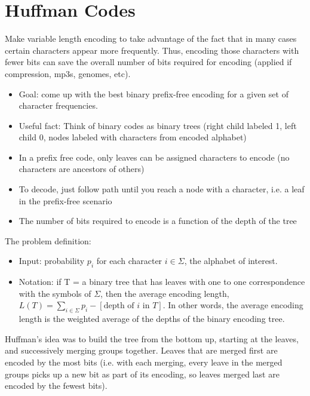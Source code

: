 \documentclass{article}
\begin{document}
\section{Huffman Codes}
Make variable length encoding to take advantage of the fact that in many cases certain characters appear more frequently.
Thus, encoding those characters with fewer bits can save the overall number of bits required for encoding (applied if compression, 
mp3s, genomes, etc).
\begin{itemize}
\item Goal: come up with the best binary prefix-free encoding for a given set of character frequencies.
\item Useful fact: Think of binary codes as binary trees (right child labeled 1, left child 0, nodes labeled with characters from
encoded alphabet)
\item In a prefix free code, only leaves can be assigned characters to encode (no characters are ancestors of others)
\item To decode, just follow path until you reach a node with a character, i.e. a leaf in the prefix-free scenario
\item The number of bits required to encode is a function of the depth of the tree
\end{itemize}
The problem definition:
\
\begin{itemize}
\item Input: probability $p_i$ for each character $i \in \Sigma$, the alphabet of interest.
\item Notation: if T = a binary tree that has leaves with one to one correspondence with the symbols of $\Sigma$,
then the average encoding length, $L(T) = \sum_{i\in\Sigma}p_i - [\text{depth of }i \text{ in } T]$.  In other words, 
the average encoding length is the weighted average of the depths of the binary encoding tree.
\end{itemize}
Huffman's idea was to build the tree from the bottom up, starting at the leaves, and successively merging groups together.
Leaves that are merged first are encoded by the most bits (i.e. with each merging, every leave in the merged groups picks
up a new bit as part of its encoding, so leaves merged last are encoded by the fewest bits).
\end{document}
